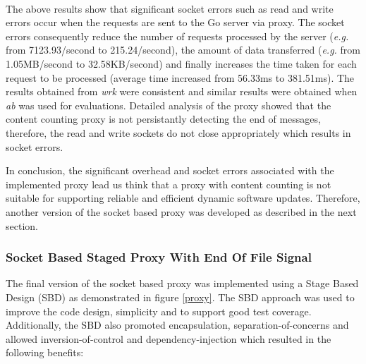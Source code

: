 \documentclass[a4paper,11pt,twoside]{article}
\begin{document}
\noindent \\
The above results show that significant socket errors such as read and write errors occur when the requests are sent to the Go server via proxy. The socket errors consequently reduce the number of requests processed by the server (\textit{e.g.} from 7123.93/second to  215.24/second), the amount of data transferred (\textit{e.g.} from 1.05MB/second to 32.58KB/second) and finally increases the time taken for each request to be processed (average time increased from 56.33ms to 381.51ms). The results obtained from \textit{wrk} were consistent and similar results were obtained when \textit{ab} was used for evaluations. Detailed analysis of the proxy showed that the content counting proxy is not persistantly detecting the end of messages, therefore, the read and write sockets do not close appropriately which results in socket errors. 

In conclusion, the significant overhead and socket errors associated with the implemented proxy lead us think that a proxy with content counting is not suitable for supporting reliable and efficient dynamic software updates. Therefore, another version of the socket based proxy was developed as described in the next section.

\subsubsection{Socket Based Staged Proxy With End Of File Signal}\label{staged}
The final version of the socket based proxy was implemented using a Stage Based Design (SBD) as demonstrated in figure \ref{proxy}. The SBD  approach was used to improve the code design, simplicity and to support good test coverage. Additionally, the SBD also promoted encapsulation, separation-of-concerns and allowed inversion-of-control and dependency-injection which resulted in the following benefits:
\end{document}
